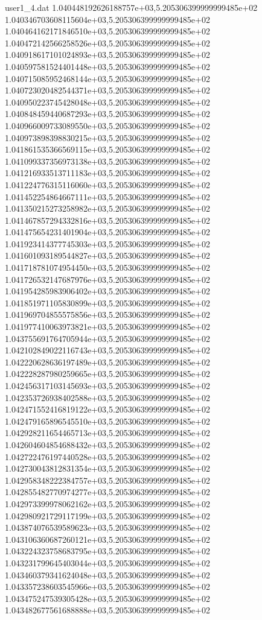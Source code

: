 \begin{filecontents}{user1_4.dat}
1.040448192626188757e+03,5.205306399999999485e+02
1.040346703608115604e+03,5.205306399999999485e+02
1.040464162171846510e+03,5.205306399999999485e+02
1.040472142566258526e+03,5.205306399999999485e+02
1.040918617101024893e+03,5.205306399999999485e+02
1.040597581524401448e+03,5.205306399999999485e+02
1.040715085952468144e+03,5.205306399999999485e+02
1.040723020482544371e+03,5.205306399999999485e+02
1.040950223745428048e+03,5.205306399999999485e+02
1.040848459440687293e+03,5.205306399999999485e+02
1.040966009733089550e+03,5.205306399999999485e+02
1.040973898398830215e+03,5.205306399999999485e+02
1.041861535366569115e+03,5.205306399999999485e+02
1.041099337356973138e+03,5.205306399999999485e+02
1.041216933513711183e+03,5.205306399999999485e+02
1.041224776315116060e+03,5.205306399999999485e+02
1.041452254864667111e+03,5.205306399999999485e+02
1.041350215273258982e+03,5.205306399999999485e+02
1.041467857294332816e+03,5.205306399999999485e+02
1.041475654231401904e+03,5.205306399999999485e+02
1.041923414377745303e+03,5.205306399999999485e+02
1.041601093189544827e+03,5.205306399999999485e+02
1.041718781074954450e+03,5.205306399999999485e+02
1.041726532147687976e+03,5.205306399999999485e+02
1.041954285983906402e+03,5.205306399999999485e+02
1.041851971105830899e+03,5.205306399999999485e+02
1.041969704855575856e+03,5.205306399999999485e+02
1.041977410063973821e+03,5.205306399999999485e+02
1.043755691764705944e+03,5.205306399999999485e+02
1.042102849022116743e+03,5.205306399999999485e+02
1.042220628636197489e+03,5.205306399999999485e+02
1.042228287980259665e+03,5.205306399999999485e+02
1.042456317103145693e+03,5.205306399999999485e+02
1.042353726938402588e+03,5.205306399999999485e+02
1.042471552416819122e+03,5.205306399999999485e+02
1.042479165896545510e+03,5.205306399999999485e+02
1.042928211654465713e+03,5.205306399999999485e+02
1.042604604854688432e+03,5.205306399999999485e+02
1.042722476197440528e+03,5.205306399999999485e+02
1.042730043812831354e+03,5.205306399999999485e+02
1.042958348222384757e+03,5.205306399999999485e+02
1.042855482770974277e+03,5.205306399999999485e+02
1.042973399978062162e+03,5.205306399999999485e+02
1.042980921729117199e+03,5.205306399999999485e+02
1.043874076539589623e+03,5.205306399999999485e+02
1.043106360687260121e+03,5.205306399999999485e+02
1.043224323758683795e+03,5.205306399999999485e+02
1.043231799645403044e+03,5.205306399999999485e+02
1.043460379341624048e+03,5.205306399999999485e+02
1.043357238603545966e+03,5.205306399999999485e+02
1.043475247539305428e+03,5.205306399999999485e+02
1.043482677561688888e+03,5.205306399999999485e+02

\end{filecontents}
